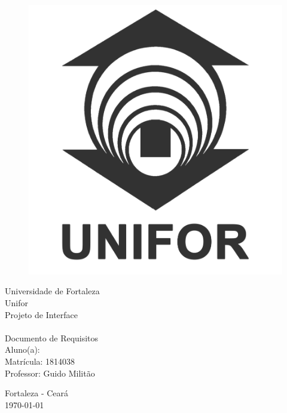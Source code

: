 \begin{titlepage}
    \begin{figure}[!htb]
      \centering 
      \includegraphics[scale=0.1]{imagens/logo-unifor.png}\\
      \label{Rotulo}
    \end{figure}
    \begin{center}
        {\large Universidade de Fortaleza}\\[0.2cm]
        {\large Unifor}\\[0.2cm]
        {\large Projeto de Interface}\\[3.0cm]
        \textbf{{\huge \myTitle}}\\[0.2cm]
        {\small Documento de Requisitos }\\[3.0cm]
        {\large Aluno(a): \myName}\\[0.7cm]
        {\small Matrícula: 1814038}\\[0.7cm]
        {\large Professor: Guido Militão}\\[3.2cm]
    \end{center}
    \begin{center}
        {\large Fortaleza - Ceará}\\[0.2cm]
        {\large \today}\\[0.2cm]
        {\small {\myVersion}}
    \end{center}
\end{titlepage}
